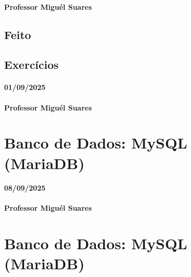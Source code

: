 \documentclass[
]{book}
\begin{document}
\subsubsection*{Professor Miguél Suares}\label{professor-miguuxe9l-suares-5}

\section{Feito}\label{feito-1}

\section{Exercícios}\label{exercuxedcios-2}

\subsubsection*{01/09/2025}\label{section-6}

\subsubsection*{Professor Miguél Suares}\label{professor-miguuxe9l-suares-6}

\chapter{Banco de Dados: MySQL (MariaDB)}\label{banco-de-dados-mysql-mariadb}

\subsubsection*{08/09/2025}\label{section-7}

\subsubsection*{Professor Miguél Suares}\label{professor-miguuxe9l-suares-7}

\chapter{Banco de Dados: MySQL (MariaDB)}\label{banco-de-dados-mysql-mariadb-1}
\end{document}
